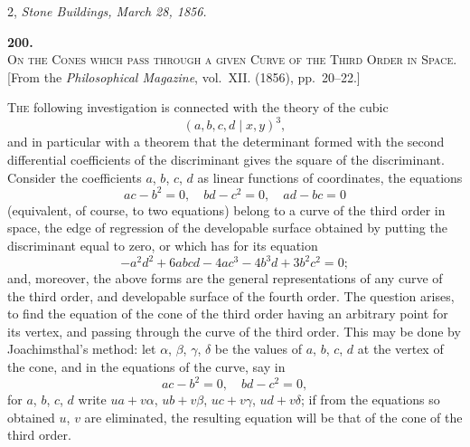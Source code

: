 \documentclass[11pt]{article}
\begin{document}
\medskip
\hfill 2, \emph{Stone Buildings, March 28, 1856.}

\clearpage


\begin{center}
\textbf{\large 200.}\\[6pt]
\textsc{On the Cones which pass through a given Curve of the Third Order in Space.}\\[4pt]
\small [From the \emph{Philosophical Magazine}, vol.\ XII. (1856), pp.\ 20--22.]
\end{center}

\medskip

\textsc{The} following investigation is connected with the theory of the cubic
\[
(a,b,c,d\mid x,y)^{3},
\]
and in particular with a theorem that the determinant formed with the second differential coefficients of the discriminant gives the square of the discriminant. Consider the coefficients $a$, $b$, $c$, $d$ as linear functions of coordinates, the equations
\[
ac-b^{2}=0,\quad bd-c^{2}=0,\quad ad-bc=0
\]
(equivalent, of course, to two equations) belong to a curve of the third order in space, the edge of regression of the developable surface obtained by putting the discriminant equal to zero, or which has for its equation
\[
-a^{2}d^{2}+6abcd-4ac^{3}-4b^{3}d+3b^{2}c^{2}=0;
\]
and, moreover, the above forms are the general representations of any curve of the third order, and developable surface of the fourth order. The question arises, to find the equation of the cone of the third order having an arbitrary point for its vertex, and passing through the curve of the third order. This may be done by Joachimsthal's method: let $\alpha$, $\beta$, $\gamma$, $\delta$ be the values of $a$, $b$, $c$, $d$ at the vertex of the cone, and in the equations of the curve, say in
\[
ac-b^{2}=0,\quad bd-c^{2}=0,
\]
for $a$, $b$, $c$, $d$ write $ua+v\alpha$, $ub+v\beta$, $uc+v\gamma$, $ud+v\delta$; if from the equations so obtained $u$, $v$ are eliminated, the resulting equation will be that of the cone of the third order.

\clearpage
\end{document}
